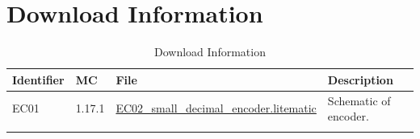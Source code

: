 \documentclass[10pt]{datasheet}
\begin{document}
\section{Download Information}
\begin{table}[h]
    \caption{Download Information}
    \begin{tabularx}{\textwidth}{l | l | l | X}
        \thickhline
        \textbf{Identifier} & \textbf{MC} & \textbf{File} & \textbf{Description} \\
        \hline
        EC01 & 1.17.1 & \href{https://github.com/Soontech-Annals/Archive/blob/8413f90a054b6c415703bae02badeba7541344f6/Archive/encoders/EC02\%20Small\%20Decimal\%20Encoder/EC02\_small\_decimal\_encoder.litematic?raw=1}{EC02\_small\_decimal\_encoder.litematic} & Schematic of encoder. \\
        \hline
        \thickhline
    \end{tabularx}
\end{table}
\end{document}
